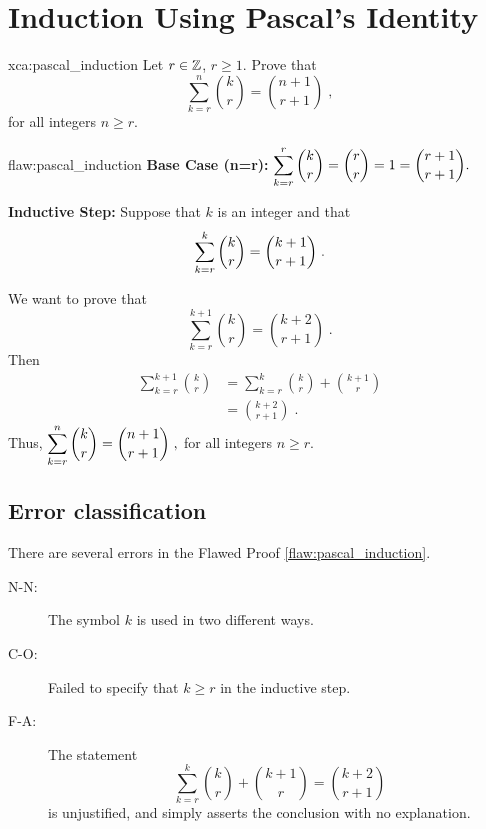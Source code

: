 \section{Induction Using Pascal's Identity}

\begin{xca}{xca:pascal_induction}
Let $r \in \mathbb Z$, $r\geq 1$.
Prove that 
$$\sum_{k=r}^{n} \binom{k}{r} = \binom{n+1}{r+1}\;,$$
for all integers $n \geq r.$
\end{xca}

\begin{flaw}{flaw:pascal_induction} %
\textbf{Base Case (n=r):} 
$\displaystyle\sum_{k=r}^{r} \binom{k}{r} = \binom{r}{r} = 1 = \binom{r+1}{r+1}.$

\textbf{Inductive Step:} Suppose that $k$ is an integer and that 
$$\displaystyle\sum_{k=r}^{k} \binom{k}{r} = \binom{k+1}{r+1}\;.$$

We want to prove that 
$$\sum_{k=r}^{k+1} \binom{k}{r} = \binom{k+2}{r+1}\;.$$
Then 
\begin{align*}
    \sum_{k=r}^{k+1} \binom{k}{r}  &= \sum_{k=r}^{k} \binom{k}{r} + \binom{k+1}{r} \\
    &= \binom{k+2}{r+1}\;.
\end{align*}
Thus, 
$\displaystyle\sum_{k=r}^{n} \binom{k}{r} = \binom{n+1}{r+1}\;,$
for all integers $n \geq r.$
\end{flaw}

\clearpage
\subsection{Error classification}


There are several errors
 in the Flawed Proof \ref{flaw:pascal_induction}.

 
 \begin{description}
 	\item[N-N:] The symbol $k$ is used in two different ways.
 	\item[C-O:] Failed to specify that $k \geq r$ in the inductive step.
 	\item[F-A:] The statement 
 	$$\sum_{k=r}^{k} \binom{k}{r} + \binom{k+1}{r} = \binom{k+2}{r+1}$$
 	is unjustified, and simply asserts the conclusion with no explanation.
 \end{description}

